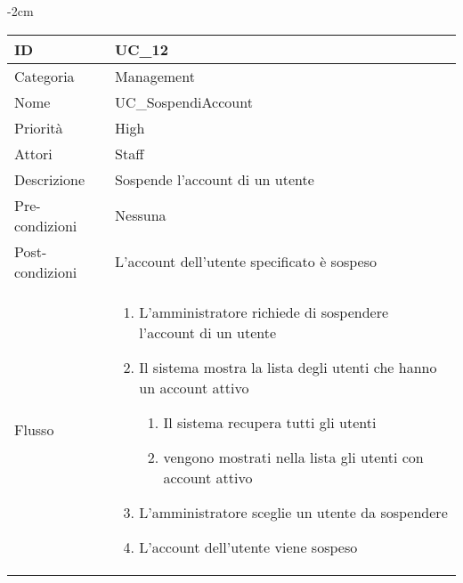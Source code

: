 \begin{center}
\begin{table}[bp]
    \centering
    \addtolength{\leftskip} {-2cm}
\begin{tabular}{ |p{2.6cm}|p{13cm}|  }
\hline
ID & UC\_12 \\\hline
Categoria & Management\\\hline
Nome & UC\_SospendiAccount\\\hline
Priorità & High \\\hline
Attori &  Staff \\\hline
Descrizione & Sospende l'account di un utente\\\hline
Pre-condizioni &  Nessuna\\\hline
Post-condizioni &  L'account dell'utente specificato è sospeso\\\hline
Flusso &  	
		\begin{enumerate}
		\item L'amministratore richiede di sospendere l'account di un utente
		\item Il sistema mostra la lista degli utenti che hanno un account attivo
			\begin{enumerate}[  ]
			\item Il sistema recupera tutti gli utenti
			\item vengono mostrati nella lista gli utenti con account attivo
			\end{enumerate}	
		\item L'amministratore sceglie un utente da sospendere
		\item L'account dell'utente viene sospeso
		\end{enumerate}\\\hline
\end{tabular}
\label{table_use_case:12}\newline
\end{table}



\end{center}
